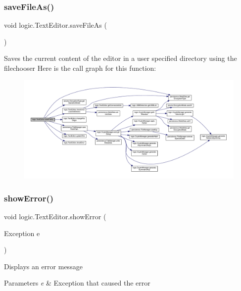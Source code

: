 \subsubsection{\texorpdfstring{save\+File\+As()}{saveFileAs()}}
{\footnotesize\ttfamily void logic.\+Text\+Editor.\+save\+File\+As (\begin{DoxyParamCaption}{ }\end{DoxyParamCaption})}

Saves the current content of the editor in a user specified directory using the filechooser Here is the call graph for this function\+:\nopagebreak
\begin{figure}[H]
\begin{center}
\leavevmode
\includegraphics[width=350pt]{classlogic_1_1_text_editor_a0581e73a9b3b6ae54a8e69de49fb9ed5_cgraph}
\end{center}
\end{figure}
\mbox{\label{classlogic_1_1_text_editor_a5fc087a73d335d9a76ebff363f073a8d}} 
\subsubsection{\texorpdfstring{show\+Error()}{showError()}}
{\footnotesize\ttfamily void logic.\+Text\+Editor.\+show\+Error (\begin{DoxyParamCaption}\item[{Exception}]{e }\end{DoxyParamCaption})\hspace{0.3cm}{\ttfamily [private]}}

Displays an error message 
\begin{DoxyParams}{Parameters}
{\em e} & Exception that caused the error \\
\hline
\end{DoxyParams}
\mbox{\label{classlogic_1_1_text_editor_a2f6a603d1650e3a718598a46c64c3c6d}} 
